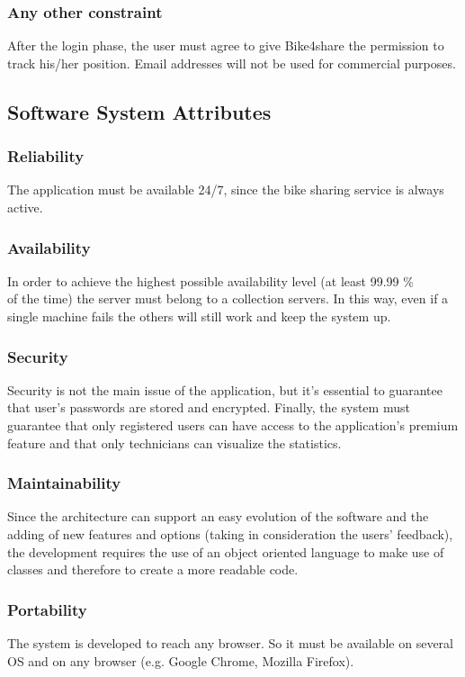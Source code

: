 \documentclass{article}
\begin{document}
\subsubsection{Any other constraint}
After the login phase, the user must agree to give Bike4share the permission to track his/her position. 
Email addresses will not be used for commercial purposes. 
\subsection{Software System Attributes}
\subsubsection{Reliability}
The application must be available 24/7, since the bike sharing service is always active.
\subsubsection{Availability} 
In order to achieve the highest possible availability level (at least 99.99 \%\\ of the time) the server must belong to a collection servers. In this way, even if a single machine fails the others will still work and keep the system up.
\subsubsection{Security}
Security is not the main issue of the application, but it’s essential to guarantee that user’s passwords are stored and encrypted. Finally, the system must guarantee that only registered users can have access to the application’s premium feature and that only technicians can visualize the statistics.

\subsubsection{Maintainability}
Since the architecture can support an easy evolution of the software and the adding of new features and options (taking in consideration the users’ feedback), the development requires the use of an object oriented language to make use of classes and therefore to create a more readable code.
\subsubsection{Portability}
The system is developed to reach any browser. So it must be available on several OS and on any browser (e.g. Google Chrome, Mozilla Firefox).
\end{document}
